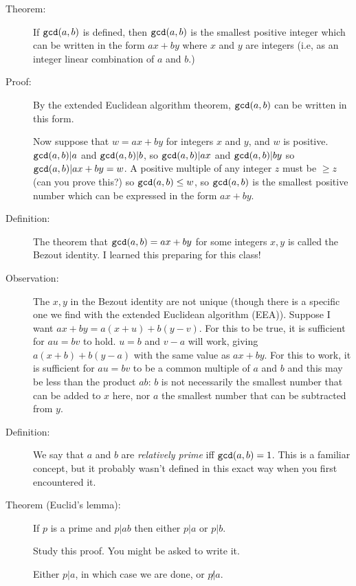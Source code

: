 \documentclass[12pt]{article}
\begin{document}
\begin{description}

\item[Theorem:]  If ${\tt gcd}(a,b)$ is defined, then ${\tt gcd}(a,b)$ is the smallest positive integer which can be written in the form $ax+by$ where $x$ and $y$ are integers (i.e, as an integer linear combination of $a$ and $b$.)

\item[Proof:]  By the extended Euclidean algorithm theorem, ${\tt gcd}(a,b)$ can be written in this form.

Now suppose that $w=ax+by$ for integers $x$ and $y$, and $w$ is positive.  ${\tt gcd}(a,b)|a$ and ${\tt gcd}(a,b)|b$, so ${\tt gcd}(a,b)|ax$ and ${\tt gcd}(a,b)|by$ so ${\tt gcd}(a,b)|ax+by=w$.  A positive multiple of any integer $z$ must be $\geq z$ (can you prove this?) so ${\tt gcd}(a,b)\leq w$, so ${\tt gcd}(a,b)$ is the smallest positive number which can be expressed in the form $ax+by$.

\item[Definition:]  The theorem that ${\tt gcd}(a,b)=ax+by$ for some integers $x,y$ is called the Bezout identity.  I learned this preparing for this class!

\item[Observation:]  The $x,y$ in the Bezout identity are not unique (though there is a specific one we find with the extended Euclidean algorithm (EEA)).  Suppose I want $ax+by = a(x+u) + b(y-v)$.  For this to be true, it is sufficient for $au=bv$ to hold.  $u=b$ and $v-a$ will work, giving
$a(x+b) + b(y-a)$ with the same value as $ax+by$.  For this to work, it is sufficient for $au=bv$ to be a common multiple of $a$ and $b$ and this may be less than the product $ab$:  $b$ is not necessarily the smallest number that can be added to $x$ here, nor $a$ the smallest number that can be subtracted from $y$.

\item[Definition:]  We say that $a$ and $b$ are {\em relatively prime\/} iff ${\tt gcd}(a,b)=1$.  This is a familiar concept, but it probably wasn't defined in this exact way when you first encountered it.

\item[Theorem (Euclid's lemma):]  If $p$ is a prime and $p|ab$ then either $p|a$ or $p|b$.

Study this proof.  You might be asked to write it.

Either $p|a$, in which case we are done, or $p\not|a$.  


\end{description}
\end{document}
